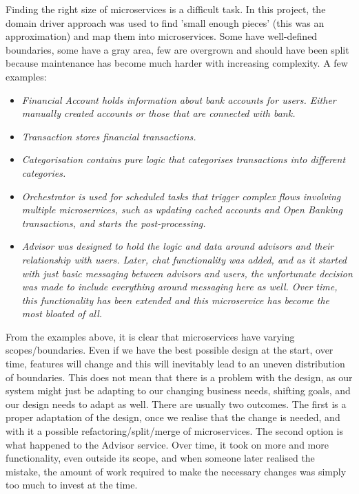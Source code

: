 Finding the right size of microservices is a difficult task. In this project, the domain driver approach was used to find 'small enough pieces' (this was an approximation) and map them into microservices. Some have well-defined boundaries, some have a gray area, few are overgrown and should have been split because maintenance has become much harder with increasing complexity. A few examples:

\begin{itemize}
    \item \it{Financial Account} holds information about bank accounts for users. Either manually created accounts or those that are connected with bank.
    \item \it{Transaction} stores financial transactions.
    \item \it{Categorisation} contains pure logic that categorises transactions into different categories.
    \item \it{Orchestrator} is used for scheduled tasks that trigger complex flows involving multiple microservices, such as updating cached accounts and Open Banking transactions, and starts the post-processing.
    \item \it{Advisor} was designed to hold the logic and data around advisors and their relationship with users. Later, chat functionality was added, and as it started with just basic messaging between advisors and users, the unfortunate decision was made to include everything around messaging here as well. Over time, this functionality has been extended and this microservice has become the most bloated of all.
\end{itemize}

From the examples above, it is clear that microservices have varying scopes/boundaries. Even if we have the best possible design at the start, over time, features will change and this will inevitably lead to an uneven distribution of boundaries. This does not mean that there is a problem with the design, as our system might just be adapting to our changing business needs, shifting goals, and our design needs to adapt as well. There are usually two outcomes. The first is a proper adaptation of the design, once we realise that the change is needed, and with it a possible refactoring/split/merge of microservices. The second option is what happened to the Advisor service. Over time, it took on more and more functionality, even outside its scope, and when someone later realised the mistake, the amount of work required to make the necessary changes was simply too much to invest at the time.

